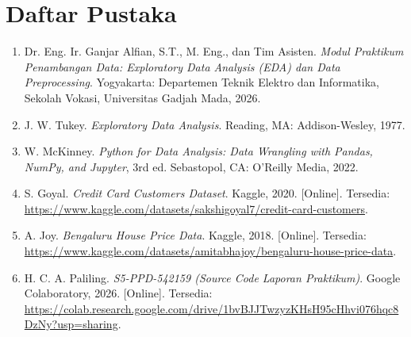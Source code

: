 \chapter{Daftar Pustaka}
\begin{enumerate}
    \item \label{modulPraktikum} Dr. Eng. Ir. Ganjar Alfian, S.T., M. Eng., dan Tim Asisten. \textit{Modul Praktikum Penambangan Data: Exploratory Data Analysis (EDA) dan Data Preprocessing}. Yogyakarta: Departemen Teknik Elektro dan Informatika, Sekolah Vokasi, Universitas Gadjah Mada, 2026.
    
    \item \label{tukey} J. W. Tukey. \textit{Exploratory Data Analysis}. Reading, MA: Addison-Wesley, 1977.
    
    \item \label{mckinney} W. McKinney. \textit{Python for Data Analysis: Data Wrangling with Pandas, NumPy, and Jupyter}, 3rd ed. Sebastopol, CA: O'Reilly Media, 2022.
    
    \item \label{kaggleCredit} S. Goyal. \textit{Credit Card Customers Dataset}. Kaggle, 2020. [Online]. Tersedia: \url{https://www.kaggle.com/datasets/sakshigoyal7/credit-card-customers}.
    
    \item \label{kaggleBengaluru} A. Joy. \textit{Bengaluru House Price Data}. Kaggle, 2018. [Online]. Tersedia: \url{https://www.kaggle.com/datasets/amitabhajoy/bengaluru-house-price-data}.
    
    \item \label{colabLaporan} H. C. A. Paliling. \textit{S5-PPD-542159 (Source Code Laporan Praktikum)}. Google Colaboratory, 2026. [Online]. Tersedia: \url{https://colab.research.google.com/drive/1bvBJJTwzyzKHsH95cHhvi076hqc8DzNy?usp=sharing}.
\end{enumerate}

